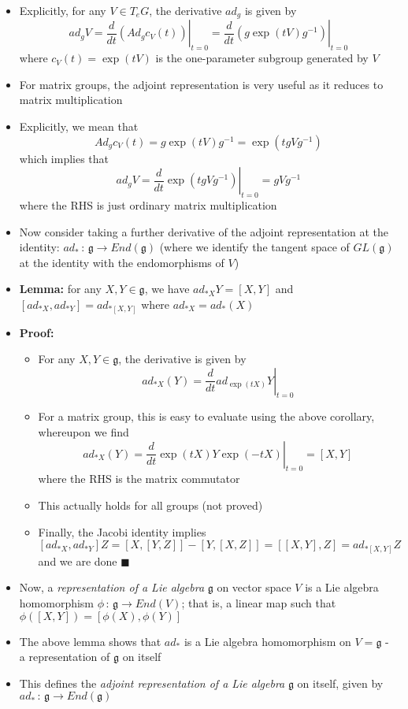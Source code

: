 \documentclass[12pt,a4paper]{article}
\numberwithin{equation}{section}
\begin{document}
\begin{itemize}
		\item Explicitly, for any $V\in T_{e}G$, the derivative $ad_{g}$ is given by
		\begin{equation}
			ad_{g}V=\left.\frac{d}{dt}(Ad_{g}c_{V}(t))\right\rvert_{t=0}=\left.\frac{d}{dt}(g\exp(tV)g^{-1})\right\rvert_{t=0}
		\end{equation}
		where $c_{V}(t)=\exp(tV)$ is the one-parameter subgroup generated by $V$
		\item For matrix groups, the adjoint representation is very useful as it reduces to matrix multiplication
		\item Explicitly, we mean that
		\begin{equation}
			Ad_{g}c_{V}(t)=g\exp(tV)g^{-1}=\exp(tgVg^{-1})
		\end{equation}
		which implies that
		\begin{equation}
			ad_{g}V=\left.\frac{d}{dt}\exp(tgVg^{-1})\right\rvert_{t=0}=gVg^{-1}
		\end{equation}
		where the RHS is just ordinary matrix multiplication
		\item Now consider taking a further derivative of the adjoint representation at the identity: $ad_{*}\,:\,\mathfrak{g}\to End(\mathfrak{g})$ (where we identify the tangent space of $GL(\mathfrak{g})$ at the identity with the endomorphisms of $V$)
		\item \textbf{Lemma:} for any $X,Y\in\mathfrak{g}$, we have $ad_{*X}Y=[X,Y]$ and $[ad_{*X},ad_{*Y}]=ad_{*[X,Y]}$ where $ad_{*X}=ad_{*}(X)$
		\item \textbf{Proof:}
		\begin{itemize}
			\item For any $X,Y\in\mathfrak{g}$, the derivative is given by
			$$
			ad_{*X}(Y)=\left.\frac{d}{dt}ad_{\exp(tX)}Y\right\rvert_{t=0}
			$$
			\item For a matrix group, this is easy to evaluate using the above corollary, whereupon we find
			$$
			ad_{*X}(Y)=\left.\frac{d}{dt}\exp(tX)Y\exp(-tX)\right\rvert_{t=0}=[X,Y]
			$$
			where the RHS is the matrix commutator
			\item This actually holds for all groups (not proved)
			\item Finally, the Jacobi identity implies
			$$
			[ad_{*X},ad_{*Y}]Z=[X,[Y,Z]]-[Y,[X,Z]]=[[X,Y],Z]=ad_{*[X,Y]}Z
			$$
			and we are done $\blacksquare$
		\end{itemize}
		\item Now, a \textit{representation of a Lie algebra} $\mathfrak{g}$ on vector space $V$ is a Lie algebra homomorphism $\phi\,:\,\mathfrak{g}\to End(V)$; that is, a linear map such that $\phi([X,Y])=[\phi(X),\phi(Y)]$
		\item The above lemma shows that $ad_{*}$ is a Lie algebra homomorphism on $V=\mathfrak{g}$ - a representation of $\mathfrak{g}$ on itself
		\item This defines the \textit{adjoint representation of a Lie algebra} $\mathfrak{g}$ on itself, given by $ad_{*}\,:\,\mathfrak{g}\to End(\mathfrak{g})$
	\end{itemize}
\end{document}
